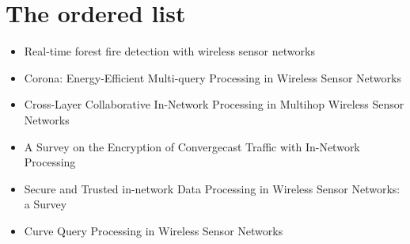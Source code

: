 \section{The ordered list}

\begin{itemize}
    \item Real-time forest fire detection with wireless sensor networks
    \item Corona: Energy-Efficient Multi-query Processing in Wireless Sensor Networks
    \item Cross-Layer Collaborative In-Network Processing in Multihop Wireless Sensor Networks
    \item A Survey on the Encryption of Convergecast Traffic with In-Network Processing
    \item Secure and Trusted in-network Data Processing in Wireless Sensor Networks: a Survey
    \item Curve Query Processing in Wireless Sensor Networks
\end{itemize}

